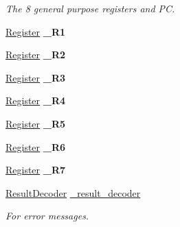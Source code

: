 \begin{DoxyCompactItemize}
\begin{DoxyCompactList}\small\item\em The 8 general purpose registers and PC. \item\end{DoxyCompactList}\item 
\hypertarget{classWi11_aa3d29c00067f173976406a1b294abe21}{
\hyperlink{classRegister}{Register} {\bfseries \_\-R1}}
\label{classWi11_aa3d29c00067f173976406a1b294abe21}

\item 
\hypertarget{classWi11_af7831a8e06325bf439bfa5121663fe84}{
\hyperlink{classRegister}{Register} {\bfseries \_\-R2}}
\label{classWi11_af7831a8e06325bf439bfa5121663fe84}

\item 
\hypertarget{classWi11_a1d05b03b7df1196df0abddd7d2a37e09}{
\hyperlink{classRegister}{Register} {\bfseries \_\-R3}}
\label{classWi11_a1d05b03b7df1196df0abddd7d2a37e09}

\item 
\hypertarget{classWi11_a3ce79df6a51764e7705aa259177bd420}{
\hyperlink{classRegister}{Register} {\bfseries \_\-R4}}
\label{classWi11_a3ce79df6a51764e7705aa259177bd420}

\item 
\hypertarget{classWi11_a3deb52eb81c25cb36572b4285eedebcb}{
\hyperlink{classRegister}{Register} {\bfseries \_\-R5}}
\label{classWi11_a3deb52eb81c25cb36572b4285eedebcb}

\item 
\hypertarget{classWi11_af45f08232aa903851a295b5259f18905}{
\hyperlink{classRegister}{Register} {\bfseries \_\-R6}}
\label{classWi11_af45f08232aa903851a295b5259f18905}

\item 
\hypertarget{classWi11_a0515ac512e8f8e3a122695f823d3abd7}{
\hyperlink{classRegister}{Register} {\bfseries \_\-R7}}
\label{classWi11_a0515ac512e8f8e3a122695f823d3abd7}

\item 
\hypertarget{classWi11_a18515d6caafb4aba3d8a9220b4ac227e}{
\hyperlink{classResultDecoder}{ResultDecoder} \hyperlink{classWi11_a18515d6caafb4aba3d8a9220b4ac227e}{\_\-result\_\-decoder}}
\label{classWi11_a18515d6caafb4aba3d8a9220b4ac227e}

\begin{DoxyCompactList}\small\item\em For error messages. \item\end{DoxyCompactList}\end{DoxyCompactItemize}


